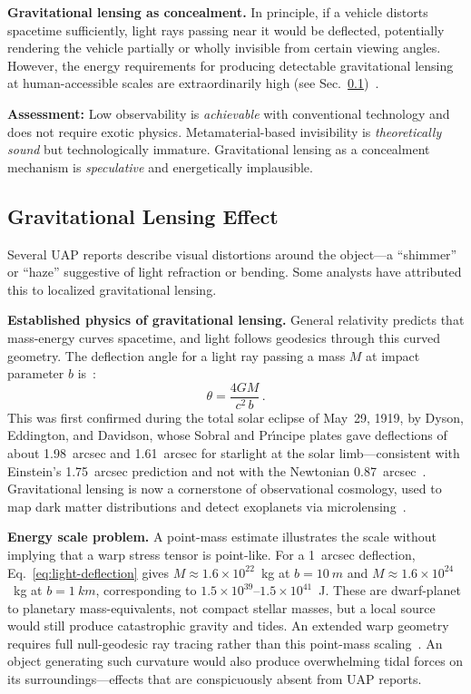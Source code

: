 \documentclass[aps,prd,twocolumn,superscriptaddress,nofootinbib,floatfix]{revtex4-2}
\begin{document}
\textbf{Gravitational lensing as concealment.} In principle, if a vehicle distorts
spacetime sufficiently, light rays passing near it would be deflected,
potentially rendering the vehicle partially or wholly invisible from certain
viewing angles. However, the energy requirements for producing detectable
gravitational lensing at human-accessible scales are extraordinarily high (see
Sec.~\ref{sec:lensing})~\cite{DysonEddington1920,MTW1973}.

\textbf{Assessment:} Low observability is \emph{achievable} with conventional
technology and does not require exotic physics. Metamaterial-based invisibility is
\emph{theoretically sound} but technologically immature. Gravitational lensing as
a concealment mechanism is \emph{speculative} and energetically implausible.

\subsection{Gravitational Lensing Effect}\label{sec:lensing}

Several UAP reports describe visual distortions around the object---a ``shimmer''
or ``haze'' suggestive of light refraction or bending. Some analysts have
attributed this to localized gravitational lensing.

\textbf{Established physics of gravitational lensing.} General relativity predicts
that mass-energy curves spacetime, and light follows geodesics through this curved
geometry. The deflection angle for a light ray passing a mass $M$ at impact
parameter $b$ is~\cite{MTW1973,Wald1984}:
\begin{equation}\label{eq:light-deflection}
  \theta = \frac{4GM}{c^{2}\,b}\,.
\end{equation}
This was first confirmed during the total solar eclipse of May~29, 1919, by Dyson,
Eddington, and Davidson, whose Sobral and Pr\'{\i}ncipe plates gave deflections of
about \SI{1.98}{arcsec} and \SI{1.61}{arcsec} for starlight at the solar
limb---consistent with Einstein's \SI{1.75}{arcsec} prediction and not with the
Newtonian \SI{0.87}{arcsec}~\cite{DysonEddington1920,GilmoreTauschPebody2022}.
Gravitational lensing is now a cornerstone of observational cosmology, used to map
dark matter distributions and detect exoplanets via
microlensing~\cite{DysonEddington1920}.

\textbf{Energy scale problem.} A point-mass estimate illustrates the scale without
implying that a warp stress tensor is point-like. For a \SI{1}{arcsec}
deflection, Eq.~\eqref{eq:light-deflection} gives $M\approx1.6\times10^{22}$~kg at
$b=\SI{10}{m}$ and $M\approx1.6\times10^{24}$~kg at $b=\SI{1}{km}$,
corresponding to $1.5\times10^{39}$--$1.5\times10^{41}$~J. These are dwarf-planet
to planetary mass-equivalents, not compact stellar masses, but a local source would
still produce catastrophic gravity and tides. An extended warp geometry requires
full null-geodesic ray tracing rather than this point-mass
scaling~\cite{DysonEddington1920,MTW1973}. An object generating such curvature
would also produce overwhelming tidal forces on its surroundings---effects that
are conspicuously absent from UAP reports.
\end{document}
